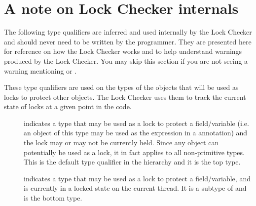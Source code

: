 \section{A note on Lock Checker internals\label{lock-checker-internals}}

The following type qualifiers are inferred and used internally by the Lock Checker
and should never need to be written by the programmer.  They are presented
here for reference on how the Lock Checker works and to help understand
warnings produced by the Lock Checker.  You may skip this section if you
are not seeing a warning mentioning  or .

These type qualifiers are used on the types of the objects that will be used
as locks to protect other objects.  The Lock Checker uses them to track the
current state of locks at a given point in the code.

\begin{description}

\item[]
  indicates a type that may be used as a lock to protect a field/variable
  (i.e. an object of this type may be used as the expression in
  a  annotation)
  and the lock may or may not be currently held.  Since any
  object can potentially be used as a lock, it in fact applies to all
  non-primitive types.  This is the default type qualifier in the
  hierarchy and it is the top type.

\item[]
  indicates a type that may be used as a lock to protect a field/variable,
  and is currently in a locked state on the current thread.  It is a
  subtype of  and is the bottom type.

\end{description}


